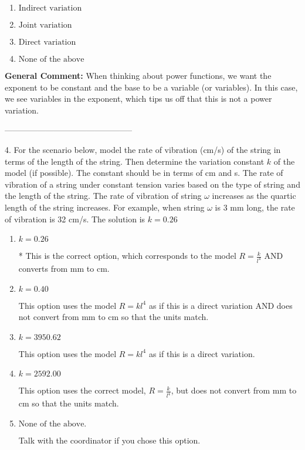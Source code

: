\documentclass{extbook}[14pt]
\begin{document}
\begin{enumerate}[label=\Alph*.] 
\item $ \text{Indirect variation} $ 

  
\item $ \text{Joint variation} $ 

  
\item $ \text{Direct variation} $ 

  
\item $ \text{None of the above} $ 

  
\end{enumerate} 
 
\textbf{General Comment:} When thinking about power functions, we want the exponent to be constant and the base to be a variable (or variables). In this case, we see variables in the exponent, which tips us off that this is not a power variation. 

-----------------------------------------------

4. For the scenario below, model the rate of vibration (cm/s) of the string in terms of the length of the string. Then determine the variation constant $k$ of the model (if possible). The constant should be in terms of cm and s.
The rate of vibration of a string under constant tension varies based on the type of string and the length of the string. The rate of vibration of string $\omega$ increases as the quartic length of the string increases. For example, when string $\omega$ is 3 mm long, the rate of vibration is 32 cm/s. 
The solution is $ k = 0.26 $ 

\begin{enumerate}[label=\Alph*.] 
\item $ k = 0.26 $ 

 * This is the correct option, which corresponds to the model $R = \frac{k}{l^{4}}$ AND converts from mm to cm. 
\item $ k = 0.40 $ 

 This option uses the model $R = kl^{4}$ as if this is a direct variation AND does not convert from mm to cm so that the units match. 
\item $ k = 3950.62 $ 

 This option uses the model $R = kl^{4}$ as if this is a direct variation. 
\item $ k = 2592.00 $ 

 This option uses the correct model, $R = \frac{k}{l^{4}}$, but does not convert from mm to cm so that the units match. 
\item $ \text{None of the above.} $ 

 Talk with the coordinator if you chose this option. 
\end{enumerate} 
 
\end{document}
